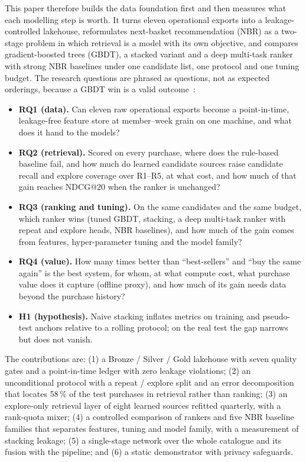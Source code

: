 \documentclass{ieeeaccess}
\newcommand{\nNoSource}{58}          %
\begin{document}
This paper therefore builds the data foundation first and then measures what each modelling step is worth. It turns eleven
operational exports into a leakage-controlled lakehouse, reformulates next-basket recommendation (NBR) as a two-stage problem in
which retrieval is a model with its own objective, and compares gradient-boosted trees (GBDT), a stacked variant and a deep
multi-task ranker with strong NBR baselines under one candidate list, one protocol and one tuning budget. The research questions are
phrased as questions, not as expected orderings, because a GBDT win is a valid outcome~\cite{grinsztajn2022tabular}:
\begin{itemize}
\item \textbf{RQ1 (data).} Can eleven raw operational exports become a point-in-time, leakage-free feature store at member--week
grain on one machine, and what does it hand to the models?
\item \textbf{RQ2 (retrieval).} Scored on every purchase, where does the rule-based baseline fail, and how much do learned candidate
sources raise candidate recall and explore coverage over R1--R5, at what cost, and how much of that gain reaches NDCG@20 when the
ranker is unchanged?
\item \textbf{RQ3 (ranking and tuning).} On the same candidates and the same budget, which ranker wins (tuned GBDT, stacking, a deep
multi-task ranker with repeat and explore heads, NBR baselines), and how much of the gain comes from features, hyper-parameter tuning
and the model family?
\item \textbf{RQ4 (value).} How many times better than ``best-sellers'' and ``buy the same again'' is the best system, for whom, at
what compute cost, what purchase value does it capture (offline proxy), and how much of its gain needs data beyond the purchase
history?
\item \textbf{H1 (hypothesis).} Naive stacking inflates metrics on training and pseudo-test anchors relative to a rolling protocol;
on the real test the gap narrows but does not vanish.
\end{itemize}

The contributions are: (1) a Bronze / Silver / Gold lakehouse with seven quality gates and a point-in-time ledger with zero leakage
violations; (2) an unconditional protocol with a repeat / explore split and an error decomposition that locates \nNoSource{}\,\% of
the test purchases in retrieval rather than ranking; (3) an explore-only retrieval layer of eight learned sources refitted
quarterly, with a rank-quota mixer; (4) a controlled comparison of rankers and five NBR baseline families that separates features,
tuning and model family, with a measurement of stacking leakage; (5) a single-stage network over the whole catalogue and its
fusion with the pipeline; and (6) a static demonstrator with privacy safeguards.
\end{document}
